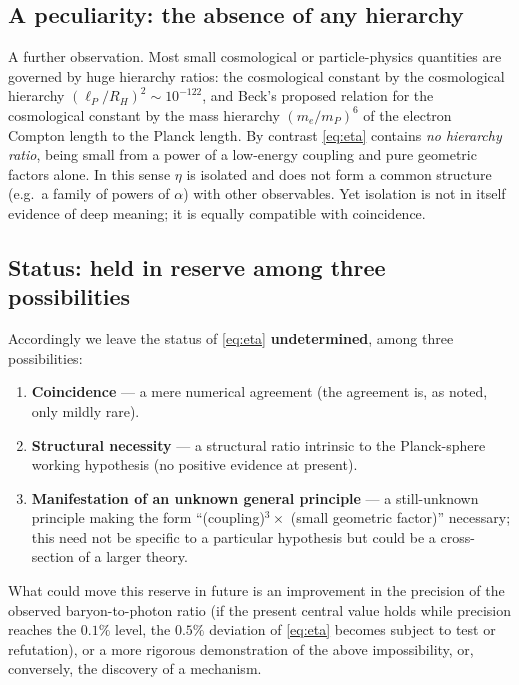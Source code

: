 \documentclass[11pt,a4paper]{article}
\newcommand{\eP}{\ell_P}
\begin{document}
\subsection{A peculiarity: the absence of any hierarchy}
A further observation. Most small cosmological or particle-physics quantities are governed by huge hierarchy ratios: the cosmological constant by the cosmological hierarchy $(\eP/R_H)^2\sim10^{-122}$, and Beck's proposed relation for the cosmological constant by the mass hierarchy $(m_e/m_P)^6$ of the electron Compton length to the Planck length. By contrast \eqref{eq:eta} contains \emph{no hierarchy ratio}, being small from a power of a low-energy coupling and pure geometric factors alone. In this sense $\eta$ is isolated and does not form a common structure (e.g.\ a family of powers of $\alpha$) with other observables. Yet isolation is not in itself evidence of deep meaning; it is equally compatible with coincidence.

\subsection{Status: held in reserve among three possibilities}
Accordingly we leave the status of \eqref{eq:eta} \textbf{undetermined}, among three possibilities:
\begin{enumerate}[leftmargin=1.6em]
\item \textbf{Coincidence} --- a mere numerical agreement (the agreement is, as noted, only mildly rare).
\item \textbf{Structural necessity} --- a structural ratio intrinsic to the Planck-sphere working hypothesis (no positive evidence at present).
\item \textbf{Manifestation of an unknown general principle} --- a still-unknown principle making the form ``(coupling)$^3 \times$ (small geometric factor)'' necessary; this need not be specific to a particular hypothesis but could be a cross-section of a larger theory.
\end{enumerate}
What could move this reserve in future is an improvement in the precision of the observed baryon-to-photon ratio (if the present central value holds while precision reaches the $0.1\%$ level, the $0.5\%$ deviation of \eqref{eq:eta} becomes subject to test or refutation), or a more rigorous demonstration of the above impossibility, or, conversely, the discovery of a mechanism.
\end{document}
